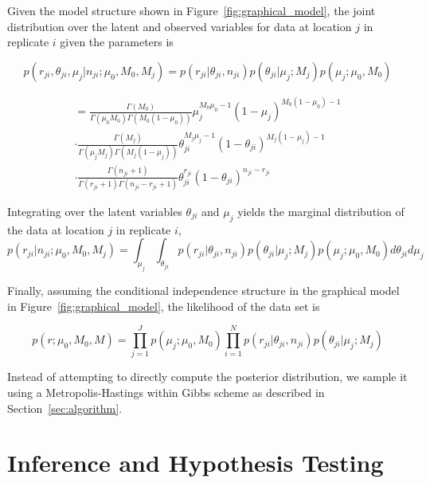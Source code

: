 \documentclass[11pt,reqno]{amsart}
\begin{document}
Given the model structure shown in Figure~\ref{fig:graphical_model}, the joint distribution over the latent and observed variables for data at location $j$ in replicate $i$ given the parameters is

\begin{equation}\label{eqn:jointpdf}
p \left( r_{ji}, \theta_{ji}, \mu_j | n_{ji}; \mu_0, M_0, M_j \right) = p \left( r_{ji} | \theta_{ji}, n_{ji} \right) p\left( \theta_{ji} | \mu_j; M_j \right) p\left( \mu_j; \mu_0, M_0 \right)
\end{equation}

\begin{gather}
= \frac{ \Gamma(M_0) } { \Gamma(\mu_0 M_0) \Gamma(M_0 (1-\mu_0)) } \mu_j^{M_0\mu_0 -1} (1 - \mu_j)^{M_0 ( 1 - \mu_0) - 1} \\
\cdot \frac{ \Gamma(M_j) } { \Gamma(\mu_j M_j) \Gamma(M_j (1-\mu_j)) } \theta_{ji}^{M_j\mu_j -1} (1 - \theta_{ji})^{M_j ( 1 - \mu_j) - 1} \\
\cdot \frac{ \Gamma(n_{ji}+1) } { \Gamma(r_{ji}+1) \Gamma( n_{ji} - r_{ji} + 1 ) } \theta_{ji}^{r_{ji}} (1 - \theta_{ji})^{n_{ji} - r_{ji}}
\end{gather}

Integrating over the latent variables $\theta_{ji}$ and $\mu_j$ yields the marginal distribution of the data at location $j$ in replicate $i$, 
\begin{equation}
p \left( r_{ji} | n_{ji} ; \mu_0, M_0, M_j \right) = \int_{\mu_j} \int_{\theta_{ji}}  p \left( r_{ji} | \theta_{ji}, n_{ji} \right) p\left( \theta_{ji} | \mu_j; M_j \right) p\left( \mu_j; \mu_0, M_0 \right) d\theta_{ji} d\mu_j
\end{equation}

Finally, assuming the conditional independence structure in the graphical model in Figure~\ref{fig:graphical_model}, the likelihood of the data set is

\begin{equation}
p \left( r ; \mu_0, M_0, M \right) = \prod_{j=1}^J p\left( \mu_j; \mu_0, M_0 \right) \prod_{i=1}^N p \left( r_{ji} | \theta_{ji}, n_{ji} \right) p\left( \theta_{ji} | \mu_j; M_j \right) 
\end{equation}

Instead of attempting to directly compute the posterior distribution, we sample it using a Metropolis-Hastings within Gibbs scheme as described in Section~\ref{sec:algorithm}.

\section{Inference and Hypothesis Testing}
\end{document}
